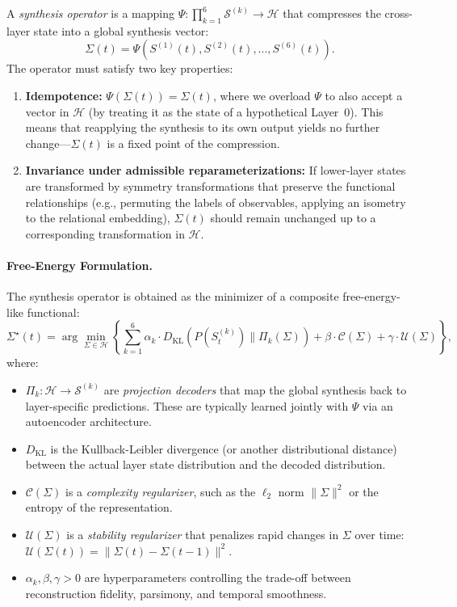 \begin{definition}
A \emph{synthesis operator} is a mapping $\Psi: \prod_{k=1}^6 \mathcal{S}^{(k)} \to \mathcal{H}$ that compresses the cross-layer state into a global synthesis vector:
\[
\Sigma(t) = \Psi(S^{(1)}(t), S^{(2)}(t), \dots, S^{(6)}(t)).
\]
The operator must satisfy two key properties:
\begin{enumerate}
    \item \textbf{Idempotence:} $\Psi(\Sigma(t)) = \Sigma(t)$, where we overload $\Psi$ to also accept a vector in $\mathcal{H}$ (by treating it as the state of a hypothetical Layer~0). This means that reapplying the synthesis to its own output yields no further change---$\Sigma(t)$ is a fixed point of the compression.
    \item \textbf{Invariance under admissible reparameterizations:} If lower-layer states are transformed by symmetry transformations that preserve the functional relationships (e.g., permuting the labels of observables, applying an isometry to the relational embedding), $\Sigma(t)$ should remain unchanged up to a corresponding transformation in $\mathcal{H}$.
\end{enumerate}
\end{definition}

\paragraph{Free-Energy Formulation.}
The synthesis operator is obtained as the minimizer of a composite free-energy-like functional:
\[
\Sigma^\star(t) = \arg\min_{\Sigma \in \mathcal{H}} \left\{ \sum_{k=1}^6 \alpha_k \cdot D_{\text{KL}}(P(S^{(k)}_t) \| \Pi_k(\Sigma)) + \beta \cdot \mathcal{C}(\Sigma) + \gamma \cdot \mathcal{U}(\Sigma) \right\},
\]
where:
\begin{itemize}
    \item $\Pi_k: \mathcal{H} \to \mathcal{S}^{(k)}$ are \emph{projection decoders} that map the global synthesis back to layer-specific predictions. These are typically learned jointly with $\Psi$ via an autoencoder architecture.
    \item $D_{\text{KL}}$ is the Kullback-Leibler divergence (or another distributional distance) between the actual layer state distribution and the decoded distribution.
    \item $\mathcal{C}(\Sigma)$ is a \emph{complexity regularizer}, such as the $\ell_2$ norm $\|\Sigma\|^2$ or the entropy of the representation.
    \item $\mathcal{U}(\Sigma)$ is a \emph{stability regularizer} that penalizes rapid changes in $\Sigma$ over time: $\mathcal{U}(\Sigma(t)) = \|\Sigma(t) - \Sigma(t-1)\|^2$.
    \item $\alpha_k, \beta, \gamma > 0$ are hyperparameters controlling the trade-off between reconstruction fidelity, parsimony, and temporal smoothness.
\end{itemize}

